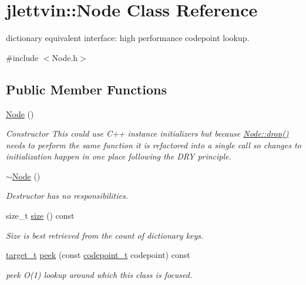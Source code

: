 \hypertarget{classjlettvin_1_1_node}{}\section{jlettvin\+:\+:Node Class Reference}
\label{classjlettvin_1_1_node}


dictionary equivalent interface\+: high performance codepoint lookup.  




{\ttfamily \#include $<$Node.\+h$>$}

\subsection*{Public Member Functions}
\begin{DoxyCompactItemize}
\item 
\hyperlink{classjlettvin_1_1_node_ad7a34779cad45d997bfd6d3d8043c75f}{Node} ()
\begin{DoxyCompactList}\small\item\em Constructor This could use C++ instance initializers but because \hyperlink{classjlettvin_1_1_node_a516768e6fc7505a9e96d9ade87f11148}{Node\+::drop()} needs to perform the same function it is refactored into a single call so changes to initialization happen in one place following the D\+R\+Y principle. \end{DoxyCompactList}\item 
\hyperlink{classjlettvin_1_1_node_aa0840c3cb5c7159be6d992adecd2097c}{$\sim$\+Node} ()
\begin{DoxyCompactList}\small\item\em Destructor has no responsibilities. \end{DoxyCompactList}\item 
size\+\_\+t \hyperlink{classjlettvin_1_1_node_ae2983972c965d0875ea34aa15aee2564}{size} () const 
\begin{DoxyCompactList}\small\item\em Size is best retrieved from the count of dictionary keys. \end{DoxyCompactList}\item 
\hyperlink{namespacejlettvin_ac925326f2732a65f4e3caaea182401a9}{target\+\_\+t} \hyperlink{classjlettvin_1_1_node_a976b319d4793fcc839604d62987fe01e}{peek} (const \hyperlink{namespacejlettvin_a5c480560edc7a71c9f5ae6dad14e6fec}{codepoint\+\_\+t} codepoint) const 
\begin{DoxyCompactList}\small\item\em peek O(1) lookup around which this class is focused. \end{DoxyCompactList}\item 

\end{DoxyCompactItemize}
